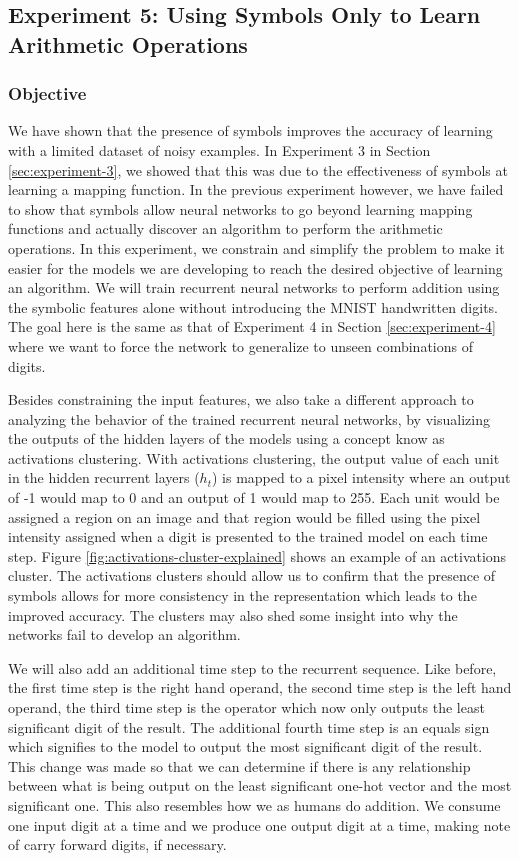 \subsection{Experiment 5: Using Symbols Only to Learn Arithmetic Operations} \label{sec:experiment-5}

\subsubsection{Objective}

We have shown that the presence of symbols improves the accuracy of learning with a limited dataset of noisy examples. In Experiment 3 in Section \ref{sec:experiment-3}, we showed that this was due to the effectiveness of symbols at learning a mapping function. In the previous experiment however, we have failed to show that symbols allow neural networks to go beyond learning mapping functions and actually discover an algorithm to perform the arithmetic operations. In this experiment, we constrain and simplify the problem to make it easier for the models we are developing to reach the desired objective of learning an algorithm. We will train recurrent neural networks to perform addition using the symbolic features alone without introducing the MNIST handwritten digits. The goal here is the same as that of Experiment 4 in Section \ref{sec:experiment-4} where we want to force the network to generalize to unseen combinations of digits.

Besides constraining the input features, we also take a different approach to analyzing the behavior of the trained recurrent neural networks, by visualizing the outputs of the hidden layers of the models using a concept know as activations clustering. With activations clustering, the output value of each unit in the hidden recurrent layers ($h_t$) is mapped to a pixel intensity where an output of -1 would map to 0 and an output of 1 would map to 255. Each unit would be assigned a region on an image and that region would be filled using the pixel intensity assigned when a digit is presented to the trained model on each time step. Figure \ref{fig:activations-cluster-explained} shows an example of an activations cluster. The activations clusters should allow us to confirm that the presence of symbols allows for more consistency in the representation which leads to the improved accuracy. The clusters may also shed some insight into why the networks fail to develop an algorithm.

We will also add an additional time step to the recurrent sequence. Like before, the first time step is the right hand operand, the second time step is the left hand operand, the third time step is the operator which now only outputs the least significant digit of the result. The additional fourth time step is an equals sign which signifies to the model to output the most significant digit of the result. This change was made so that we can determine if there is any relationship between what is being output on the least significant one-hot vector and the most significant one. This also resembles how we as humans do addition. We consume one input digit at a time and we produce one output digit at a time, making note of carry forward digits, if necessary.


